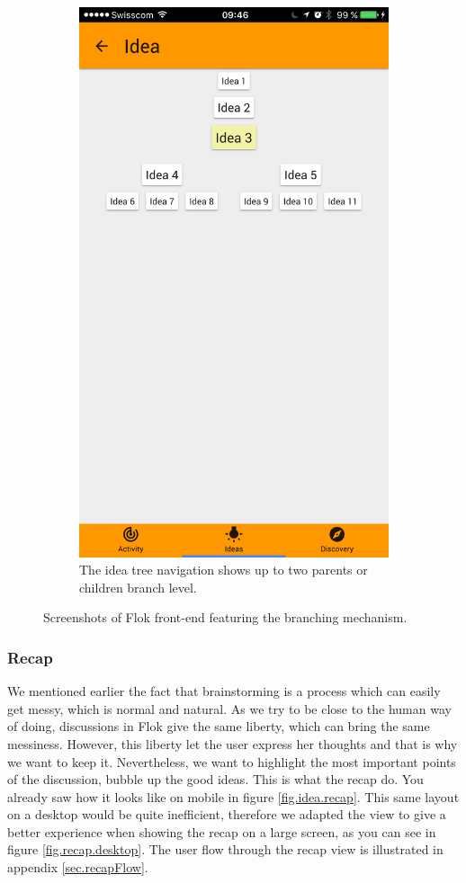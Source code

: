 \documentclass[a4paper,12pt,twoside]{article}
\begin{document}
\begin{figure}[!htb]
\begin{subfigure}[t]{.48\textwidth}
        \includegraphics[width=.67\textwidth]{images/branches_navigation.png}
        \caption{The idea tree navigation shows up to two parents or children branch level.}
    \end{subfigure}
    \caption{Screenshots of Flok front-end featuring the branching mechanism.}
    \label{fig.branches}
\end{figure}

\subsubsection{Recap}
\label{sec.recap}
We mentioned earlier the fact that brainstorming is a process which can easily get messy, which is normal and natural.
As we try to be close to the human way of doing, discussions in Flok give the same liberty, which can bring the same messiness.
However, this liberty let the user express her thoughts and that is why we want to keep it.
Nevertheless, we want to highlight the most important points of the discussion, bubble up the good ideas.
This is what the recap do.
You already saw how it looks like on mobile in figure \ref{fig.idea.recap}.
This same layout on a desktop would be quite inefficient, therefore we adapted the view to give a better experience when showing the recap on a large screen, as you can see in figure \ref{fig.recap.desktop}.
The user flow through the recap view is illustrated in appendix \ref{sec.recapFlow}.
\end{document}
